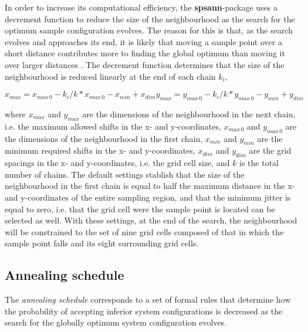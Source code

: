 In order to increase its computational efficiency, the \textbf{spsann}-package 
uses a decrement function to reduce the size of the neighbourhood as the search
for the optimum sample configuration evolves. The reason for this is that, as 
the search evolves and approaches its end, it is likely that moving a sample 
point over a short distance contributes more to finding the global optimum than 
moving it over larger distances \citep{GroenigenEtAl1998}. The decrement 
function determines that the size of the neighbourhood is reduced linearly at 
the end of each chain $k_i$,

\begin{equation}
  x_{max} = x_{max\,0} - k_i / k * x_{max\,0} - x_{min} + x_{dim}

  y_{max} = y_{max\,0} - k_i / k * y_{max\,0} - y_{min} + y_{dim}
\end{equation}

where $x_{max}$ and $y_{max}$ are the dimensions of the neighbourhood in the 
next chain, i.e. the maximum allowed shifts in the x- and y-coordinates, 
$x_{max\,0}$ and $y_{max\,0}$ are the dimensions of the neighbourhood in the 
first chain, $x_{min}$ and $y_{min}$ are the minimum required shifts in the x- 
and y-coordinates, $x_{dim}$ and $y_{dim}$ are the grid spacings in the x- and 
y-coordinates, i.e. the grid cell size, and $k$ is the total number of chains.
The default settings stablish that the size of the neighbourhood in the first
chain is equal to half the maximum distance in the x- and y-coordinates of the
entire sampling region, and that the minimum jitter is equal to zero, i.e. that
the grid cell were the sample point is located can be selected as well. With 
these settings, at the end of the search, the neighbourhood will be constrained 
to the set of nine grid cells composed of that in which the sample point falls
and its eight surrounding grid cells.

\subsection{Annealing schedule}

The \textit{annealing schedule} corresponds to a set of formal rules that 
determine how the probability of accepting inferior system configurations is 
decreased as the search for the globally optimum system configuration evolves.

